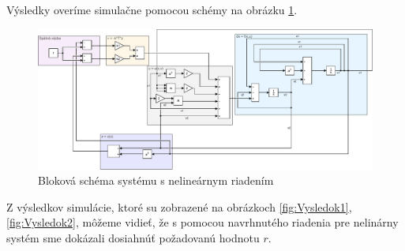 \documentclass[../main.tex]{subfiles}
\begin{document}
Výsledky overíme simulačne pomocou schémy na obrázku \ref{fig:PrikladsRiadenim}.

\newpage
	
\begin{figure}[H]
	\begin{center}\includegraphics[scale=0.8,angle=90]{Rovnica1MVS.pdf}\end{center}
	\caption{Bloková schéma systému s nelineárnym riadením}
	\label{fig:PrikladsRiadenim}
\end{figure}


Z výsledkov simulácie, ktoré su zobrazené na obrázkoch \ref{fig:Vysledok1}, \ref{fig:Vysledok2}, môžeme vidieť, že s pomocou navrhnutého riadenia pre nelinárny systém sme dokázali dosiahnúť požadovanú hodnotu $r$.
\end{document}
